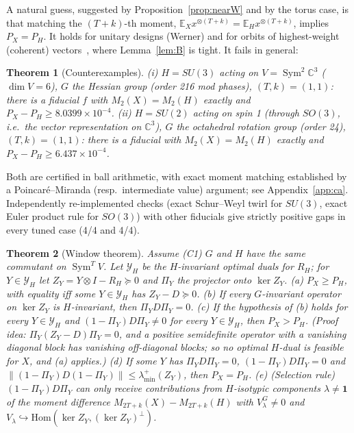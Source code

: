\documentclass[11pt]{article}
\newcommand{\C}{\mathbb{C}}
\newcommand{\E}{\mathbb{E}}
\newcommand{\Sym}{\operatorname{Sym}}
\newtheorem{theorem}{Theorem}
\theoremstyle{definition}
\theoremstyle{remark}
\begin{document}
A natural guess, suggested by Proposition~\ref{prop:nearW} and by the torus case, is that matching the $(T+k)$-th moment,
$\E_X x^{\otimes(T+k)}=\E_H x^{\otimes(T+k)}$, implies $P_X=P_H$. It holds for unitary designs (Werner) and for orbits of
highest-weight (coherent) vectors~\cite{ChiribellaYang2014,CwiklinskiStudzinski2026}, where Lemma~\ref{lem:B} is tight. It fails in general:

\begin{theorem}[Counterexamples]\label{thm:counter}
(i) $H=SU(3)$ acting on $V=\Sym^2\C^3$ ($\dim V=6$), $G$ the Hessian group (order 216 mod phases), $(T,k)=(1,1)$: there is a
fiducial $f$ with $M_2(X)=M_2(H)$ exactly and $P_X-P_H\ge8.0399\times10^{-4}$.
(ii) $H=SU(2)$ acting on spin 1 (through $SO(3)$, i.e.\ the vector representation on $\C^3$), $G$ the octahedral rotation group (order 24), $(T,k)=(1,1)$: there is a fiducial with
$M_2(X)=M_2(H)$ exactly and $P_X-P_H\ge6.437\times10^{-4}$.
\end{theorem}
Both are certified in ball arithmetic, with exact moment matching established by a Poincar\'e--Miranda (resp.\ intermediate value)
argument; see Appendix~\ref{app:ca}. Independently re-implemented checks (exact Schur--Weyl twirl for $SU(3)$, exact Euler product
rule for $SO(3)$) with other fiducials give strictly positive gaps in every tuned case (4/4 and 4/4).

\begin{theorem}[Window theorem]\label{thm:window}
Assume (C1) $G$ and $H$ have the same commutant on $\Sym^TV$. Let $\mathcal Y_H$ be the $H$-invariant optimal duals for $R_H$; for
$Y\in\mathcal Y_H$ let $Z_Y=Y\otimes I-R_H\succeq0$ and $\Pi_Y$ the projector onto $\ker Z_Y$.
(a) $P_X\ge P_H$, with equality iff some $Y\in\mathcal Y_H$ has $Z_Y-D\succeq0$.
(b) If every $G$-invariant operator on $\ker Z_Y$ is $H$-invariant, then $\Pi_YD\Pi_Y=0$.
(c) If the hypothesis of (b) holds for every $Y\in\mathcal Y_H$ and $(1-\Pi_Y)D\Pi_Y\ne0$ for every $Y\in\mathcal Y_H$, then
$P_X>P_H$. (Proof idea: $\Pi_Y(Z_Y-D)\Pi_Y=0$, and a positive semidefinite operator with a vanishing diagonal block has vanishing
off-diagonal blocks; so no optimal $H$-dual is feasible for $X$, and (a) applies.)
(d) If some $Y$ has $\Pi_YD\Pi_Y=0$, $(1-\Pi_Y)D\Pi_Y=0$ and $\lVert(1-\Pi_Y)D(1-\Pi_Y)\rVert\le\lambda^+_{\min}(Z_Y)$, then $P_X=P_H$.
(e) (Selection rule) $(1-\Pi_Y)D\Pi_Y$ can only receive contributions from $H$-isotypic components $\lambda\ne\mathbf1$ of the moment
difference $M_{2T+k}(X)-M_{2T+k}(H)$ with $V_\lambda^G\ne0$ and $V_\lambda\hookrightarrow\mathrm{Hom}(\ker Z_Y,(\ker Z_Y)^\perp)$.
\end{theorem}
\end{document}
